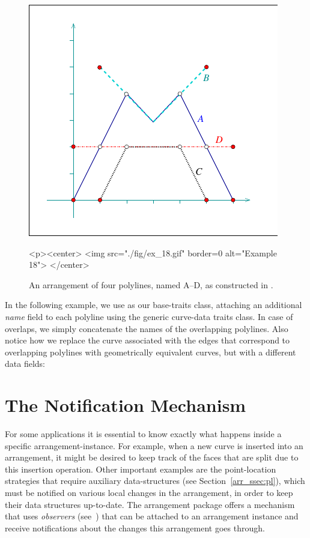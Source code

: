 \begin{figure}[!htp]
\begin{ccTexOnly}
  \begin{center}
  \includegraphics{Arrangement_2/fig/ex_18}
  \end{center}
\end{ccTexOnly}
\begin{ccHtmlOnly}
  <p><center>
  <img src="./fig/ex_18.gif" border=0 alt="Example 18">
  </center>
\end{ccHtmlOnly}
\caption{An arrangement of four polylines, named A--D, as
constructed in .}
\label{arr_fig:ex_18}
\end{figure}

In the following example, we use  as
our base-traits class, attaching an additional {\em name} field to
each polyline using the generic curve-data traits class. In case of
overlaps, we simply concatenate the names of the overlapping
polylines. Also notice how we replace the curve associated with
the edges that correspond to overlapping polylines with 
geometrically equivalent curves, but with a different data fields:


\section{The Notification Mechanism}
\label{arr_sec:notif}
%
For some applications it is essential to know exactly what
happens inside a specific arrangement-instance. For example, when
a new curve is inserted into an arrangement, it might be desired to keep
track of the faces that are split due to this insertion operation.
Other important examples are the point-location strategies that
require auxiliary data-structures (see Section~\ref{arr_ssec:pl}),
which must be notified on various local changes in the arrangement,
in order to keep their data structures up-to-date. The arrangement
package offers a mechanism that uses {\em observers} 
(see~\cite{cgal:ghjv-dpero-95}) that can be
attached to an arrangement instance and receive notifications
about the changes this arrangement goes through.

